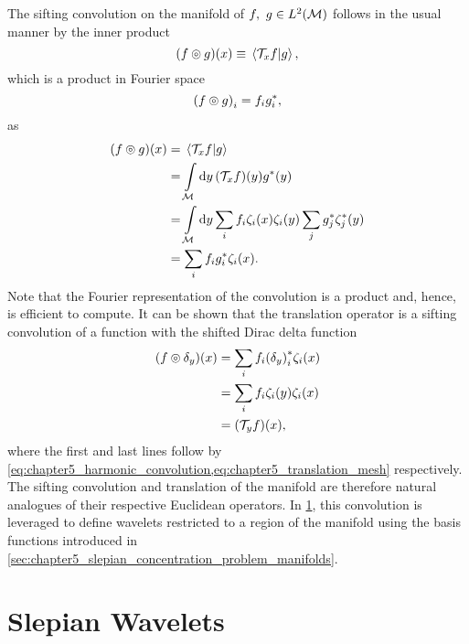 The sifting convolution on the manifold of \(f,\ g \in L^{2}(\mathcal{M})\) follows in the usual manner by the inner product
%
\begin{equation}
	(f \circledcirc{} g)(x)
	\equiv \braket*{\mathcal{T}_{x}f}{g},
\end{equation}
%
which is a product in Fourier space
%
\begin{equation}\label{eq:chapter5_harmonic_convolution}
	{(f \circledcirc{} g)}_{i}
	= f_{i} g_{i}^{\ast},
\end{equation}
%
as
%
\begin{align}
	(f \circledcirc{} g)(x)
	 & = \braket*{\mathcal{T}_{x}f}{g} \nonumber{}                                                                                           \\
	 & = \displaystyle\int\limits_{\mathcal{M}} \dd{y} (\mathcal{T}_{x}f)(y) g^{\ast}(y) \nonumber{}                                                       \\
	 & = \displaystyle\int\limits_{\mathcal{M}} \dd{y} \displaystyle\sum\limits_{i} f_{i} \zeta_{i}(x) \zeta_{i}(y) \displaystyle\sum\limits_{j} g_{j}^{\ast} \zeta_{j}^{\ast}(y) \nonumber{} \\
	 & = \displaystyle\sum\limits_{i} f_{i} g_{i}^{\ast} \zeta_{i}(x).
\end{align}
%
Note that the Fourier representation of the convolution is a product and, hence, is efficient to compute.
It can be shown that the translation operator is a sifting convolution of a function with the shifted Dirac delta function
%
\begin{align}
	(f \circledcirc{} \delta_{y})(x)
	 & = \displaystyle\sum\limits_{i} f_{i} {(\delta_{y})}_{i}^{\ast} \zeta_{i}(x) \nonumber{} \\
	 & = \displaystyle\sum\limits_{i} f_{i} \zeta_{i}(y) \zeta_{i}(x) \nonumber{}         \\
	 & = (\mathcal{T}_{y}f)(x),
\end{align}
%
where the first and last lines follow by \cref{eq:chapter5_harmonic_convolution,eq:chapter5_translation_mesh} respectively.
The sifting convolution and translation of the manifold are therefore natural analogues of their respective Euclidean operators.
In \cref{sec:chapter5_slepian_wavelets}, this convolution is leveraged to define wavelets restricted to a region of the manifold using the basis functions introduced in \cref{sec:chapter5_slepian_concentration_problem_manifolds}.

\section{Slepian Wavelets}\label{sec:chapter5_slepian_wavelets}

